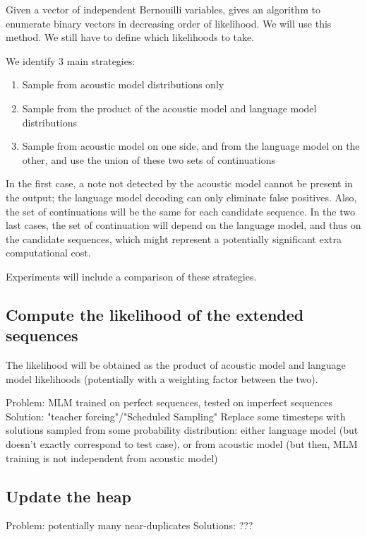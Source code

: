 \documentclass{article}
\begin{document}
Given a vector of independent Bernouilli variables, \cite{Boulanger-Lewandowski2013} gives an algorithm to enumerate binary vectors in decreasing order of likelihood.
We will use this method.
We still have to define which likelihoods to take.

We identify 3 main strategies:

\begin{enumerate}
\item Sample from acoustic model distributions only
\item Sample from the product of the acoustic model and language model distributions
\item Sample from acoustic model on one side, and from the language model on the other, and use the union of these two sets of continuations
\end{enumerate}

In the first case, a note not detected by the acoustic model cannot be present in the output; the language model decoding can only eliminate false positives.
Also, the set of continuations will be the same for each candidate sequence.
In the two last cases, the set of continuation will depend on the language model, and thus on the candidate sequences, which might represent a potentially significant extra computational cost.

Experiments will include a comparison of these strategies.

\subsection{Compute the likelihood of the extended sequences}

The likelihood will be obtained as the product of acoustic model and language model likelihoods (potentially with a weighting factor between the two).

Problem: MLM trained on perfect sequences, tested on imperfect sequences
Solution: "teacher forcing"/"Scheduled Sampling" \cite{Bengio2015}
Replace some timesteps with solutions sampled from some probability distribution: either language model (but doesn't exactly correspond to test case), or from acoustic model (but then, MLM training is not independent from acoustic model)

\subsection{Update the heap}

Problem: potentially many near-duplicates
Solutions: ???





\end{document}
